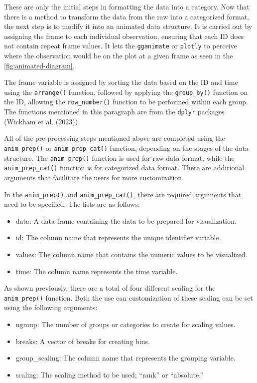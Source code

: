These are only the initial steps in formatting the data into a category. Now that there is a method to transform the data from the raw into a categorized format, the next step is to modify it into an animated data structure. It is carried out by assigning the frame to each individual observation, ensuring that each ID does not contain repeat frame values. It lets the \texttt{gganimate} or \texttt{plotly} to perceive where the observation would be on the plot at a given frame as seen in the \ref{fig:animated-diagram}.

The frame variable is assigned by sorting the data based on the ID and time using the \texttt{arrange()} function, followed by applying the \texttt{group\_by()} function on the ID, allowing the \texttt{row\_number()} function to be performed within each group. The functions mentioned in this paragraph are from the \texttt{dplyr} packages (Wickham et al. (2023)).

All of the pre-processing steps mentioned above are completed using the \texttt{anim\_prep()} or \texttt{anim\_prep\_cat()} function, depending on the stages of the data structure. The \texttt{anim\_prep()} function is used for raw data format, while the \texttt{anim\_prep\_cat()} function is for categorized data format. There are additional arguments that facilitate the users for more customization.

In the \texttt{anim\_prep()} and \texttt{anim\_prep\_cat()}, there are required arguments that need to be specified. The lists are as follows:

\begin{itemize}
\tightlist
\item
  data: A data frame containing the data to be prepared for visualization.
\item
  id: The column name that represents the unique identifier variable.
\item
  values: The column name that contains the numeric values to be visualized.
\item
  time: The column name represents the time variable.
\end{itemize}

As shown previously, there are a total of four different scaling for the \texttt{anim\_prep()} function. Both the use can customization of these scaling can be set using the following arguments:

\begin{itemize}
\tightlist
\item
  ngroup: The number of groups or categories to create for scaling values.
\item
  breaks: A vector of breaks for creating bins.
\item
  group\_scaling: The column name that represents the grouping variable.
\item
  scaling: The scaling method to be used; ``rank'' or ``absolute.''
\end{itemize}

